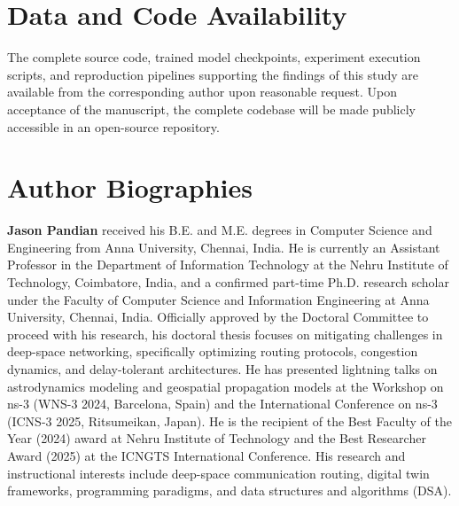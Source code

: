 \documentclass[preprint,12pt]{elsarticle}
\begin{document}
\section*{Data and Code Availability}
The complete source code, trained model checkpoints, experiment execution scripts, and reproduction pipelines supporting the findings of this study are available from the corresponding author upon reasonable request. Upon acceptance of the manuscript, the complete codebase will be made publicly accessible in an open-source repository.

\section*{Author Biographies}

\noindent \textbf{Jason Pandian} received his B.E. and M.E. degrees in Computer Science and Engineering from Anna University, Chennai, India. He is currently an Assistant Professor in the Department of Information Technology at the Nehru Institute of Technology, Coimbatore, India, and a confirmed part-time Ph.D. research scholar under the Faculty of Computer Science and Information Engineering at Anna University, Chennai, India. Officially approved by the Doctoral Committee to proceed with his research, his doctoral thesis focuses on mitigating challenges in deep-space networking, specifically optimizing routing protocols, congestion dynamics, and delay-tolerant architectures. He has presented lightning talks on astrodynamics modeling and geospatial propagation models at the Workshop on ns-3 (WNS-3 2024, Barcelona, Spain) and the International Conference on ns-3 (ICNS-3 2025, Ritsumeikan, Japan). He is the recipient of the Best Faculty of the Year (2024) award at Nehru Institute of Technology and the Best Researcher Award (2025) at the ICNGTS International Conference. His research and instructional interests include deep-space communication routing, digital twin frameworks, programming paradigms, and data structures and algorithms (DSA).



\end{document}
